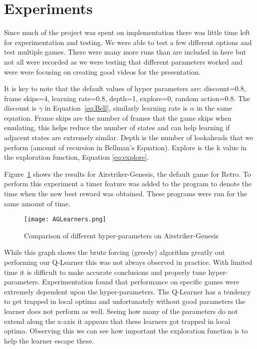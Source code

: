 \section{Experiments}
Since much of the project was spent on implementation there was little time
left for experimentation and testing. We were able to test a few different 
options and test multiple games. There were many more runs than are included
in here but not all were recorded as we were testing that different parameters
worked and were were focusing on creating good videos for the presentation.

It is key to note that the default values of hyper parameters are:
discount=0.8, frame skips=4, learning rate=0.8, depth=1, explore=0, 
random action=0.8. The discount is $\gamma$ in Equation~\ref{eq:Bell}, similarly
learning rate is $\alpha$ in the same equation. Frame skips are the number of
frames that the game skips when emulating, this helps reduce the number of 
states and can help learning if adjacent states are extremely similar. Depth
is the number of lookaheads that we perform (amount of recursion in Bellman's
Equation). Explore is the k value in the exploration function, Equation
\ref{eq:explore}.

Figure~\ref{fig:AGLearn} shows the results for Airstriker-Genesis, the 
default game for Retro. To perform this experiment a timer feature was
added to the program to denote the time when the new best reward was obtained.
These programs were run for the same amount of time.
\begin{figure}[ht]
    \centering
    \texttt{[image: AGLearners.png]}
    \caption{Comparison of different hyper-parameters on Airstriker-Genesis}
    \label{fig:AGLearn}
\end{figure}
While this graph shows the brute forcing (greedy) algorithm greatly out
performing our Q-Learner this was not always observed in practice. With
limited time it is difficult to make accurate conclusions and properly tune
hyper-parameters. Experimentation found that performance on specific games
were extremely dependent upon the hyper-parameters. The Q-Learner has a tendency
to get trapped in local optima and unfortunately without good parameters 
the learner does not perform as well. Seeing how many of the parameters
do not extend along the x-axis it appears that these learners got trapped in 
local optima. Observing this we can see how important the exploration function
is to help the learner escape these.


